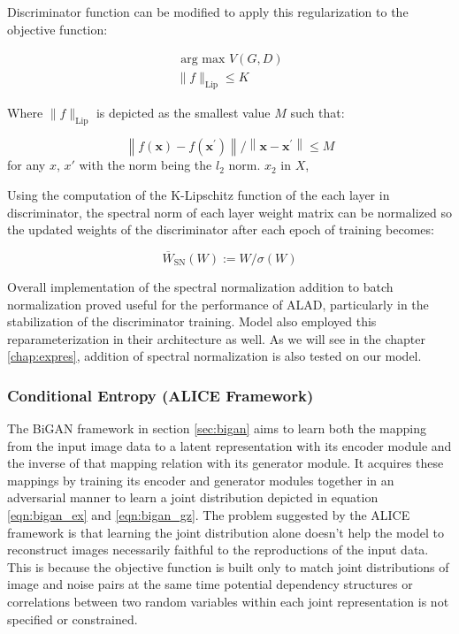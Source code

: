 Discriminator function can be modified to apply this regularization to the objective function: 
    
\begin{equation}
\begin{array}{l}{\text { arg max } V(G, D)} \\ {\|f\|_{\mathrm{Lip}} \leq K}\end{array} 
\end{equation}

Where $\|f\|_{\mathrm{Lip}}$ is depicted as the smallest value $M$ such that: 

\begin{equation}
    \left\|f(\boldsymbol{x})-f\left(\boldsymbol{x}^{\prime}\right)\right\| /\left\|\boldsymbol{x}-\boldsymbol{x}^{\prime}\right\| \leq M 
\end{equation}
for any $x$, $x'$ with the norm being the $l_2$ norm. $x_2$ in $X$,\cite{sohrab2011basic}

Using the computation of the K-Lipschitz function of the each layer in discriminator, the spectral
norm of each layer weight matrix can be normalized so the updated weights of the discriminator after
each epoch of training becomes:

\begin{equation}
    \overline{W}_{\mathrm{SN}}(W) :=W / \sigma(W) 
\end{equation}

Overall implementation of the spectral normalization addition to batch normalization proved useful for the performance of 
ALAD, particularly in the stabilization of the discriminator training. Model also employed this reparameterization in their 
architecture as well. As we will see in the chapter \ref{chap:expres}, addition of spectral normalization is also tested on our model.

\subsubsection{Conditional Entropy (ALICE Framework)}
\label{sec:alad_alice}

The BiGAN framework in section \ref{sec:bigan} aims to learn both the mapping from the input image
data to a latent representation with its encoder module and the inverse of that mapping relation
with its generator module. It acquires these mappings by training its encoder and generator modules
together in an adversarial manner to learn a joint distribution depicted in equation
\ref{eqn:bigan_ex} and \ref{eqn:bigan_gz}. The problem suggested by the ALICE
framework\cite{Li2017TowardsUA} is that learning the joint distribution alone doesn't help the model
to reconstruct images necessarily faithful to the reproductions of the input data.
\cite{Li2017TowardsUA} This is because the objective function is built only to match joint
distributions of image and noise pairs at the same time potential dependency structures or
correlations between two random variables within each joint representation is not specified or
constrained. \cite{Li2017TowardsUA}

